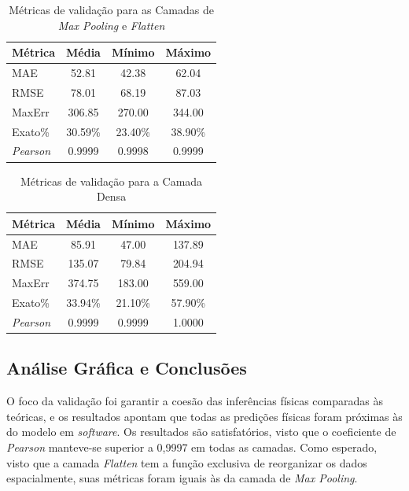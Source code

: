 \begin{table}[htbp]
\centering
\caption{Métricas de validação para as Camadas de \textit{Max \textit{Pooling}}  e \textit{Flatten} }
\label{tab:metricas_pool_flatten}
\begin{tabular}{lccc}
\toprule
\textbf{Métrica} & \textbf{Média} & \textbf{Mínimo} & \textbf{Máximo} \\
\midrule
MAE     & 52.81   & 42.38   & 62.04   \\
RMSE    & 78.01   & 68.19   & 87.03   \\
MaxErr  & 306.85  & 270.00  & 344.00  \\
Exato\% & 30.59\% & 23.40\% & 38.90\% \\
\textit{Pearson} & 0.9999  & 0.9998  & 0.9999  \\
\bottomrule
\end{tabular}
\end{table}

\begin{table}[htbp]
\centering
\caption{Métricas de validação para a Camada Densa}
\label{tab:metricas_densa}
\begin{tabular}{lccc}
\toprule
\textbf{Métrica} & \textbf{Média} & \textbf{Mínimo} & \textbf{Máximo} \\
\midrule
MAE     & 85.91   & 47.00   & 137.89  \\
RMSE    & 135.07  & 79.84   & 204.94  \\
MaxErr  & 374.75  & 183.00  & 559.00  \\
Exato\% & 33.94\% & 21.10\% & 57.90\% \\
\textit{Pearson} & 0.9999  & 0.9999  & 1.0000  \\
\bottomrule
\end{tabular}
\end{table}

\subsection{Análise Gráfica e Conclusões}

O foco da validação foi garantir a coesão das inferências físicas comparadas às teóricas, e os resultados apontam que todas as predições físicas foram próximas às do modelo em \textit{software}. Os resultados são satisfatórios, visto que o coeficiente de \textit{Pearson} manteve-se superior a 0,9997 em todas as camadas. Como esperado, visto que a camada \textit{Flatten}  tem a função exclusiva de reorganizar os dados espacialmente, suas métricas foram iguais às da camada de \textit{Max \textit{Pooling}}.

